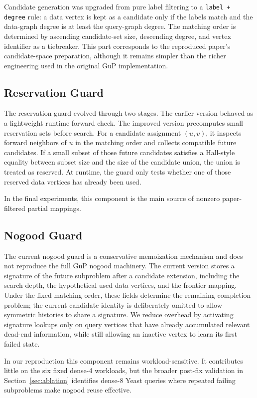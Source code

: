 Candidate generation was upgraded from pure label filtering to a \texttt{label + degree} rule: a data vertex is kept as a candidate only if the labels match and the data-graph degree is at least the query-graph degree. The matching order is determined by ascending candidate-set size, descending degree, and vertex identifier as a tiebreaker. This part corresponds to the reproduced paper's candidate-space preparation, although it remains simpler than the richer engineering used in the original GuP implementation.

\subsection{Reservation Guard}

The reservation guard evolved through two stages. The earlier version behaved as a lightweight runtime forward check. The improved version precomputes small reservation sets before search. For a candidate assignment $(u, v)$, it inspects forward neighbors of $u$ in the matching order and collects compatible future candidates. If a small subset of those future candidates satisfies a Hall-style equality between subset size and the size of the candidate union, the union is treated as reserved. At runtime, the guard only tests whether one of those reserved data vertices has already been used.

In the final experiments, this component is the main source of nonzero paper-filtered partial mappings.

\subsection{Nogood Guard}

The current nogood guard is a conservative memoization mechanism and does not reproduce the full GuP nogood machinery. The current version stores a signature of the future subproblem after a candidate extension, including the search depth, the hypothetical used data vertices, and the frontier mapping. Under the fixed matching order, these fields determine the remaining completion problem; the current candidate identity is deliberately omitted to allow symmetric histories to share a signature. We reduce overhead by activating signature lookups only on query vertices that have already accumulated relevant dead-end information, while still allowing an inactive vertex to learn its first failed state.

In our reproduction this component remains workload-sensitive. It contributes little on the six fixed dense-4 workloads, but the broader post-fix validation in Section~\ref{sec:ablation} identifies dense-8 Yeast queries where repeated failing subproblems make nogood reuse effective.

